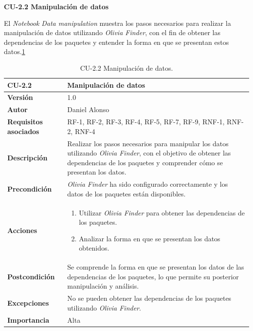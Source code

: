 \textbf{CU-2.2 Manipulación de datos}

El \textit{Notebook} \textit{Data manipulation} muestra los pasos necesarios para realizar la
manipulación de datos utilizando \textit{Olivia Finder}, con el fin de obtener las dependencias
de los paquetes y entender la forma en que se presentan estos datos.\ref{tab:cu2.2}

\begin{table}[h!]
	\centering
	\begin{tabularx}{\linewidth}{ p{} p{} }
		\toprule
		\textbf{CU-2.2}               & \textbf{Manipulación de datos}                                                      \\
		\toprule
		\textbf{Versión}              & 1.0                                                                                 \\
		\textbf{Autor}                & Daniel Alonso                                                                       \\
		\textbf{Requisitos asociados} & RF-1, RF-2, RF-3, RF-4, RF-5, RF-7, RF-9, RNF-1, RNF-2, RNF-4                                                              \\
		\textbf{Descripción}          & Realizar los pasos necesarios para manipular los datos
		utilizando \textit{Olivia Finder}, con el objetivo de obtener las dependencias de los
		paquetes y comprender cómo se presentan los datos.                                                                  \\
		\textbf{Precondición}         & \textit{Olivia Finder} ha sido configurado correctamente y los datos
		de los paquetes están disponibles.                                                                                  \\
		\textbf{Acciones}             & \begin{enumerate}
			                                \item Utilizar \textit{Olivia Finder} para obtener las dependencias de los paquetes.
			                                \item Analizar la forma en que se presentan los datos obtenidos.
		                                \end{enumerate} \\
		\textbf{Postcondición}        & Se comprende la forma en que se presentan los datos de las
		dependencias de los paquetes, lo que permite su posterior manipulación y análisis.                                  \\
		\textbf{Excepciones}          & No se pueden obtener las dependencias de los paquetes
		utilizando \textit{Olivia Finder}.                                                                                  \\
		\textbf{Importancia}          & Alta                                                                                \\
		\bottomrule
	\end{tabularx}
	\caption{CU-2.2 Manipulación de datos.}
	\label{tab:cu2.2}
\end{table}

